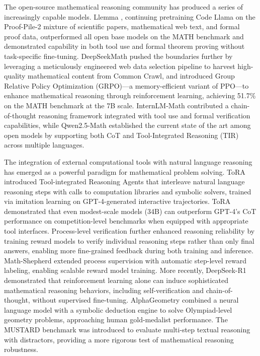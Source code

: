 \documentclass[11pt,a4paper]{article}
\begin{document}
The open-source mathematical reasoning community has produced a series of increasingly capable models. Llemma \citep{azerbayev2024llemma}, continuing pretraining Code Llama on the Proof-Pile-2 mixture of scientific papers, mathematical web text, and formal proof data, outperformed all open base models on the MATH benchmark and demonstrated capability in both tool use and formal theorem proving without task-specific fine-tuning. DeepSeekMath \citep{shao2024deepseekmath} pushed the boundaries further by leveraging a meticulously engineered web data selection pipeline to harvest high-quality mathematical content from Common Crawl, and introduced Group Relative Policy Optimization (GRPO)---a memory-efficient variant of PPO---to enhance mathematical reasoning through reinforcement learning, achieving 51.7\% on the MATH benchmark at the 7B scale. InternLM-Math \citep{ying2024internlmmath} contributed a chain-of-thought reasoning framework integrated with tool use and formal verification capabilities, while Qwen2.5-Math \citep{yang2024qwen25math} established the current state of the art among open models by supporting both CoT and Tool-Integrated Reasoning (TIR) across multiple languages.

The integration of external computational tools with natural language reasoning has emerged as a powerful paradigm for mathematical problem solving. ToRA \citep{gou2024tora} introduced Tool-integrated Reasoning Agents that interleave natural language reasoning steps with calls to computation libraries and symbolic solvers, trained via imitation learning on GPT-4-generated interactive trajectories. ToRA demonstrated that even modest-scale models (34B) can outperform GPT-4's CoT performance on competition-level benchmarks when equipped with appropriate tool interfaces. Process-level verification \citep{lightman2024lets} further enhanced reasoning reliability by training reward models to verify individual reasoning steps rather than only final answers, enabling more fine-grained feedback during both training and inference. Math-Shepherd \citep{wang2024math} extended process supervision with automatic step-level reward labeling, enabling scalable reward model training. More recently, DeepSeek-R1 \citep{deepseekai2025deepseekr1} demonstrated that reinforcement learning alone can induce sophisticated mathematical reasoning behaviors, including self-verification and chain-of-thought, without supervised fine-tuning. AlphaGeometry \citep{trinh2024alphageometry} combined a neural language model with a symbolic deduction engine to solve Olympiad-level geometry problems, approaching human gold-medalist performance. The MUSTARD benchmark \citep{huang2024mustard} was introduced to evaluate multi-step textual reasoning with distractors, providing a more rigorous test of mathematical reasoning robustness.
\end{document}
